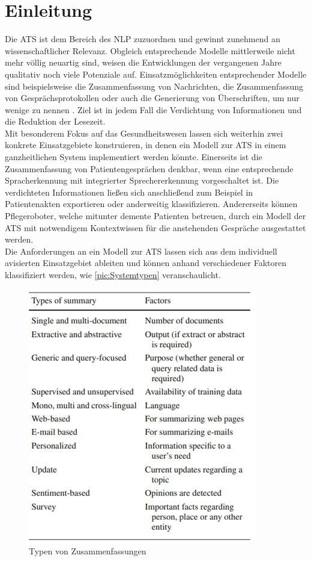 \chapter{Einleitung}
\thispagestyle{fancy}
\label{chap:Einleitung}

Die \ac{ATS} ist dem Bereich des \ac{NLP} zuzuordnen und gewinnt zunehmend an wissenschaftlicher Relevanz. Obgleich entsprechende Modelle mittlerweile nicht mehr völlig neuartig sind, weisen die Entwicklungen der vergangenen Jahre qualitativ noch viele Potenziale auf. Einsatzmöglichkeiten entsprechender Modelle sind beispielsweise die Zusammenfassung von Nachrichten, die Zusammenfassung von Gesprächsprotokollen oder auch die Generierung von Überschriften, um nur wenige zu nennen \cite{GON20, GAM16}. Ziel ist in jedem Fall die Verdichtung von Informationen und die Reduktion der Lesezeit.\\

Mit besonderem Fokus auf das Gesundheitswesen lassen sich weiterhin zwei konkrete Einsatzgebiete konstruieren, in denen ein Modell zur \ac{ATS} in einem ganzheitlichen System implementiert werden könnte. Einerseits ist die Zusammenfassung von Patientengesprächen denkbar, wenn eine entsprechende Spracherkennung mit integrierter Sprechererkennung vorgeschaltet ist. Die verdichteten Informationen ließen sich anschließend zum Beispiel in Patientenakten exportieren oder anderweitig klassifizieren. Andererseits können Pflegeroboter, welche mitunter demente Patienten betreuen, durch ein Modell der \ac{ATS} mit notwendigem Kontextwissen für die anstehenden Gespräche ausgestattet werden.\\

Die Anforderungen an ein Modell zur \ac{ATS} lassen sich aus dem individuell avisierten Einsatzgebiet ableiten und können anhand verschiedener Faktoren klassifiziert werden, wie \autoref{pic:Systemtypen} veranschaulicht.

\begin{figure}
  \centering
  \includegraphics[scale=0.8]{./source/images/systemtypen.jpg}
  \caption{Typen von Zusammenfassungen \cite{GAM16}}
  \label{pic:Systemtypen}
\end{figure}


